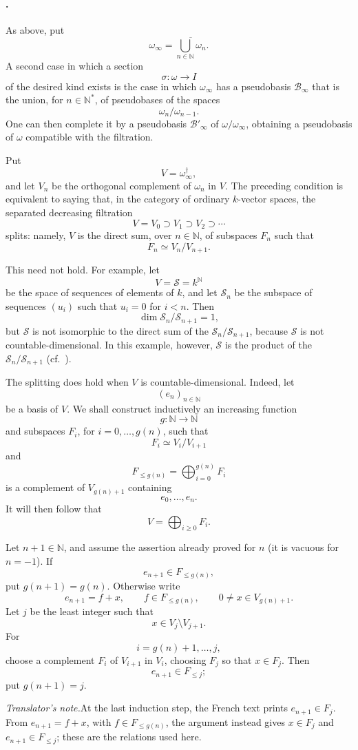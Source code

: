 
\paragraph{.}
\label{sga3:VIIB:5.2.1.B}

As above, put
\[
  \omega_\infty
  =
  \overline{\bigcup_{n\in\mathbb N}\omega_n}.
\]
A second case in which a section
\[
  \sigma:\omega\longrightarrow I
\]
of the desired kind exists is the case in which
\(\omega_\infty\) has a pseudobasis \(\mathscr B_\infty\) that
is the union, for \(n\in\mathbb N^*\), of pseudobases of the
spaces
\[
  \omega_n/\omega_{n-1}.
\]
One can then complete it by a pseudobasis
\(\mathscr B'_\infty\) of \(\omega/\omega_\infty\), obtaining a
pseudobasis of \(\omega\) compatible with the filtration.

Put
\[
  V=\omega_\infty^\dagger,
\]
and let \(V_n\) be the orthogonal complement of \(\omega_n\) in
\(V\). The preceding condition is equivalent to saying that, in
the category of ordinary \(k\)-vector spaces, the separated
decreasing filtration
\[
  V=V_0\supset V_1\supset V_2\supset\cdots
\]
splits: namely, \(V\) is the direct sum, over
\(n\in\mathbb N\), of subspaces \(F_n\) such that
\[
  F_n\simeq V_n/V_{n+1}.
\]

This need not hold. For example, let
\[
  V=\mathscr S=k^{\mathbb N}
\]
be the space of sequences of elements of \(k\), and let
\(\mathscr S_n\) be the subspace of sequences
\((u_i)\) such that \(u_i=0\) for \(i<n\). Then
\[
  \dim\mathscr S_n/\mathscr S_{n+1}=1,
\]
but \(\mathscr S\) is not isomorphic to the direct sum of the
\(\mathscr S_n/\mathscr S_{n+1}\), because \(\mathscr S\) is not
countable-dimensional. In this example, however, \(\mathscr S\)
is the product of the \(\mathscr S_n/\mathscr S_{n+1}\)
\textup{(cf.\ )}.

The splitting does hold when \(V\) is
countable-dimensional.
Indeed, let
\[
  (e_n)_{n\in\mathbb N}
\]
be a basis of \(V\). We shall construct inductively an increasing
function
\[
  g:\mathbb N\longrightarrow\mathbb N
\]
and subspaces \(F_i\), for \(i=0,\ldots,g(n)\), such that
\[
  F_i\simeq V_i/V_{i+1}
\]
and
\[
  F_{\leq g(n)}
  =
  \bigoplus_{i=0}^{g(n)}F_i
\]
is a complement of \(V_{g(n)+1}\) containing
\[
  e_0,\ldots,e_n.
\]
It will then follow that
\[
  V=\bigoplus_{i\geq0}F_i.
\]

Let \(n+1\in\mathbb N\), and assume the assertion already proved
for \(n\) \textup{(it is vacuous for \(n=-1\))}. If
\[
  e_{n+1}\in F_{\leq g(n)},
\]
put \(g(n+1)=g(n)\). Otherwise write
\[
  e_{n+1}=f+x,
  \qquad
  f\in F_{\leq g(n)},
  \qquad
  0\ne x\in V_{g(n)+1}.
\]
Let \(j\) be the least integer such that
\[
  x\in V_j\setminus V_{j+1}.
\]
For
\[
  i=g(n)+1,\ldots,j,
\]
choose a complement \(F_i\) of \(V_{i+1}\) in \(V_i\), choosing
\(F_j\) so that \(x\in F_j\). Then
\[
  e_{n+1}\in F_{\leq j};
\]
put \(g(n+1)=j\).

\label{sga3:VIIB:5.2.1.B:induction-source-note}
\noindent\textit{Translator's note.}\enspace At the last induction step, the French text prints
\(e_{n+1}\in F_j\). From
\(e_{n+1}=f+x\), with \(f\in F_{\leq g(n)}\), the argument
instead gives \(x\in F_j\) and
\(e_{n+1}\in F_{\leq j}\); these are the relations used here.
